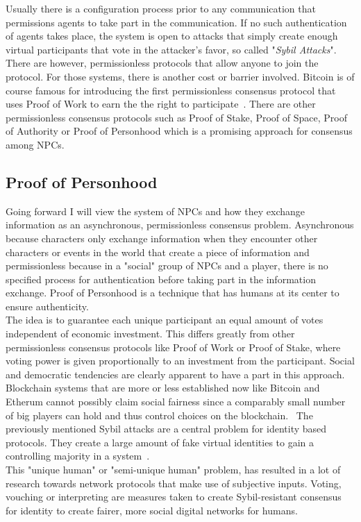 Usually there is a configuration process prior to any communication that permissions agents to take part in the communication. If no such authentication of agents takes place, the system is open to attacks that simply create enough virtual participants that vote in the attacker's favor, so called "\textit{Sybil Attacks}". There are however, permissionless protocols that allow anyone to join the protocol. For those systems, there is another cost or barrier involved. Bitcoin is of course famous for introducing the first permissionless consensus protocol that uses Proof of Work to earn the the right to participate~\cite{Gervais2016}. There are other permissionless consensus protocols such as Proof of Stake, Proof of Space, Proof of Authority or Proof of Personhood which is a promising approach for consensus among NPCs.~\cite{Coulouris2001}
\subsection{Proof of Personhood}
Going forward I will view the system of NPCs and how they exchange information as an asynchronous, permissionless consensus problem. Asynchronous because characters only exchange information when they encounter other characters or events in the world that create a piece of information and permissionless because in a "social" group of NPCs and a player, there is no specified process for authentication before taking part in the information exchange. Proof of Personhood is a technique that has humans at its center to ensure authenticity.~\cite{Borge2017}\\
The idea is to guarantee each unique participant an equal amount of votes independent of economic investment. This differs greatly from other permissionless consensus protocols like Proof of Work or Proof of Stake, where voting power is given proportionally to an investment from the participant. Social and democratic tendencies are clearly apparent to have a part in this approach. Blockchain systems that are more or less established now like Bitcoin and Etherum cannot possibly claim social fairness since a comparably small number of big players can hold and thus control choices on the blockchain.~\cite{Siddarth2020}
The previously mentioned Sybil attacks are a central problem for identity based protocols. They create a large amount of fake virtual identities to gain a controlling majority in a system~\cite{Douceur2002}.\\
This "unique human" or "semi-unique human" problem, has resulted in a lot of research towards network protocols that make use of subjective inputs. Voting, vouching or interpreting are measures taken to create Sybil-resistant consensus for identity to create fairer, more social digital networks for humans.~\cite{Siddarth2020}\\
